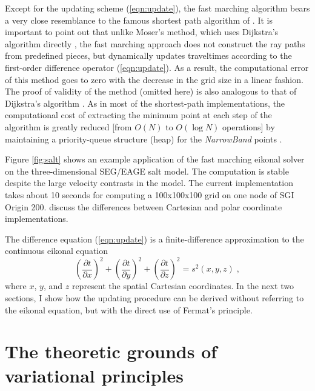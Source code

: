 Except for the updating scheme (\ref{eqn:update}), the fast marching
algorithm bears a very close resemblance to the famous shortest path
algorithm of \cite{dijkstra}.  It is important to point out that
unlike Moser's method, which uses Dijkstra's algorithm directly
\cite[]{GEO56-01-00590067}, the fast marching approach does not
construct the ray paths from predefined pieces, but dynamically
updates traveltimes according to the first-order difference operator
(\ref{eqn:update}). As a result, the computational error of this
method goes to zero with the decrease in the grid size in a linear
fashion.  The proof of validity of the method (omitted here) is also
analogous to that of Dijkstra's algorithm \cite[]{paper2,book}. As in
most of the shortest-path implementations, the computational cost of
extracting the minimum point at each step of the algorithm is greatly
reduced [from $O (N)$ to $O (\log N)$ operations] by maintaining a
priority-queue structure (heap) for the \emph{NarrowBand} points
\cite[]{mit}.


Figure \ref{fig:salt} shows an example application of the fast marching
eikonal solver on the three-dimensional SEG/EAGE salt model.  The computation
is stable despite the large velocity contrasts in the model. The current
implementation takes about 10 seconds for computing a 100x100x100 grid on one
node of SGI Origin 200. \cite{Alkhalifah.sep.95.tariq5} discuss the
differences between Cartesian and polar coordinate implementations.

\par
The difference equation (\ref{eqn:update}) is a finite-difference approximation
to the continuous eikonal equation
\begin{equation}
\label{eqn:eikonal}
\left(\frac{\partial t}{\partial x}\right)^2 +
\left(\frac{\partial t}{\partial y}\right)^2 +
\left(\frac{\partial t}{\partial z}\right)^2 = s^2 (x,y,z)\;,
\end{equation}
where $x$, $y$, and $z$ represent the spatial Cartesian
coordinates. In the next two sections, I show how the updating
procedure can be derived without referring to the eikonal
equation, but with the direct use of Fermat's principle.

\section{The theoretic grounds of variational principles}

